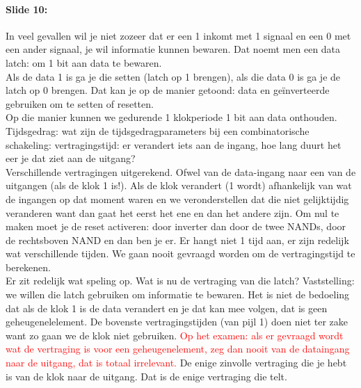 \documentclass[10pt,a4paper]{book}
\begin{document}
\paragraph{Slide 10:} In veel gevallen wil je niet zozeer dat er een 1 inkomt met 1 signaal en een 0 met een ander signaal, je wil informatie kunnen bewaren. Dat noemt men een data latch: om 1 bit aan data te bewaren.\\
Als de data 1 is ga je die setten (latch op 1 brengen), als die data 0 is ga je de latch op 0 brengen. Dat kan je op de manier getoond: data en ge\"inverteerde gebruiken om te setten of resetten.\\
Op die manier kunnen we gedurende 1 klokperiode 1 bit aan data onthouden.\\
Tijdsgedrag: wat zijn de tijdsgedragparameters bij een combinatorische schakeling: vertragingstijd: er verandert iets aan de ingang, hoe lang duurt het eer je dat ziet aan de uitgang?\\
Verschillende vertragingen uitgerekend. Ofwel van de data-ingang naar een van de uitgangen (als de klok 1 is!). Als de klok verandert (1 wordt) afhankelijk van wat de ingangen op dat moment waren en we veronderstellen dat die niet gelijktijdig veranderen want dan gaat het eerst het ene en dan het andere zijn. Om nul te maken moet je de reset activeren: door inverter dan door de twee NANDs, door de rechtsboven NAND en dan ben je er. Er hangt niet 1 tijd aan, er zijn redelijk wat verschillende tijden. We gaan nooit gevraagd worden om de vertragingstijd te berekenen.\\
Er zit redelijk wat speling op. Wat is nu de vertraging van die latch? Vaststelling: we willen die latch gebruiken om informatie te bewaren. Het is niet de bedoeling dat als de klok 1 is de data verandert en je dat kan mee volgen, dat is geen geheugenelelement. De bovenste vertragingstijden (van pijl 1) doen niet ter zake want zo gaan we de klok niet gebruiken. \textcolor{red}{Op het examen: als er gevraagd wordt wat de vertraging is voor een geheugenelement, zeg dan nooit van de dataingang naar de uitgang, dat is totaal irrelevant.} De enige zinvolle vertraging die je hebt is van de klok naar de uitgang. Dat is de enige vertraging die telt. 
\end{document}
